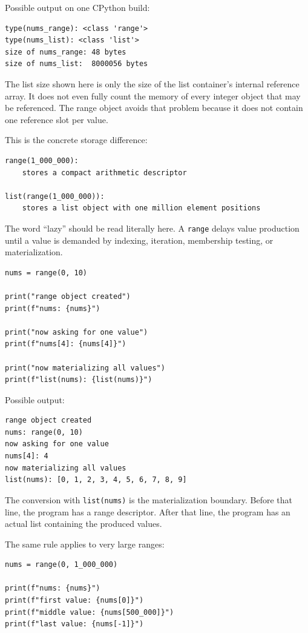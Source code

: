\documentclass[a4paper,twoside]{report}
\begin{document}
Possible output on one CPython build:

\begin{verbatim}
type(nums_range): <class 'range'>
type(nums_list): <class 'list'>
size of nums_range: 48 bytes
size of nums_list:  8000056 bytes
\end{verbatim}

The list size shown here is only the size of the list container's internal reference array. It does not even fully count the memory of every integer object that may be referenced. The range object avoids that problem because it does not contain one reference slot per value.

This is the concrete storage difference:

\begin{verbatim}
range(1_000_000):
    stores a compact arithmetic descriptor

list(range(1_000_000)):
    stores a list object with one million element positions
\end{verbatim}

The word \enquote{lazy} should be read literally here. A \texttt{range} delays value production until a value is demanded by indexing, iteration, membership testing, or materialization.

\begin{verbatim}
nums = range(0, 10)

print("range object created")
print(f"nums: {nums}")

print("now asking for one value")
print(f"nums[4]: {nums[4]}")

print("now materializing all values")
print(f"list(nums): {list(nums)}")
\end{verbatim}

Possible output:

\begin{verbatim}
range object created
nums: range(0, 10)
now asking for one value
nums[4]: 4
now materializing all values
list(nums): [0, 1, 2, 3, 4, 5, 6, 7, 8, 9]
\end{verbatim}

The conversion with \texttt{list(nums)} is the materialization boundary. Before that line, the program has a range descriptor. After that line, the program has an actual list containing the produced values.

The same rule applies to very large ranges:

\begin{verbatim}
nums = range(0, 1_000_000)

print(f"nums: {nums}")
print(f"first value: {nums[0]}")
print(f"middle value: {nums[500_000]}")
print(f"last value: {nums[-1]}")
\end{verbatim}
\end{document}
